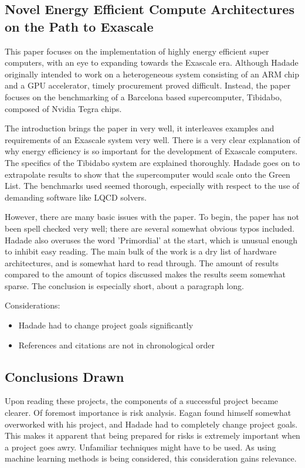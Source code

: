 \documentclass[../main.tex]{subfiles}
\begin{document}
  \subsection{Novel Energy Efficient Compute Architectures on the Path to Exascale}
    This paper focuses on the implementation of highly energy efficient super computers, with an eye to expanding towards the Exascale era.
    Although Hadade originally intended to work on a heterogeneous system consisting of an ARM chip and a GPU accelerator, timely procurement proved difficult.
    Instead, the paper focuses on the benchmarking of a Barcelona based supercomputer, Tibidabo, composed  of Nvidia Tegra chips.

    The introduction brings the paper in very well, it interleaves examples and requirements of an Exascale system very well.
    There is a very clear explanation of why energy efficiency is so important for the development of Exascale computers.
    The specifics of the Tibidabo system are explained thoroughly.
    Hadade goes on to extrapolate results to show that the supercomputer would scale onto the Green List.
    The benchmarks used seemed thorough, especially with respect to the use of demanding software like LQCD solvers.

    However, there are many basic issues with the paper.
    To begin, the paper has not been spell checked very well; there are several somewhat obvious typos included.
    Hadade also overuses the word 'Primordial' at the start, which is unusual enough to inhibit easy reading.
    The main bulk of the work is a dry list of hardware architectures, and is somewhat hard to read through.
    The amount of results compared to the amount of topics discussed makes the results seem somewhat sparse.
    The conclusion is especially short, about a paragraph long.
    
    Considerations:
    \begin{itemize}
      \item Hadade had to change project goals significantly
      \item References and citations are not in chronological order
    \end{itemize}
 
  \subsection{Conclusions Drawn}
    Upon reading these projects, the components of a successful project became clearer.
    Of foremost importance is risk analysis.
    Eagan found himself somewhat overworked with his project, and Hadade had to completely change project goals.
    This makes it apparent that being prepared for risks is extremely important when a project goes awry.
    Unfamiliar techniques might have to be used.
    As using machine learning methods is being considered, this consideration gains relevance.
    
\end{document}
